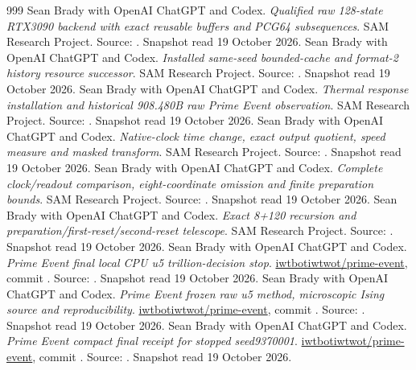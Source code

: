 \begin{thebibliography}{999}
 Sean Brady with OpenAI ChatGPT and Codex. \emph{Qualified raw 128-state RTX3090 backend with exact reusable buffers and PCG64 subsequences}. SAM Research Project. Source: . Snapshot read 19 October 2026.
 Sean Brady with OpenAI ChatGPT and Codex. \emph{Installed same-seed bounded-cache and format-2 history resource successor}. SAM Research Project. Source: . Snapshot read 19 October 2026.
 Sean Brady with OpenAI ChatGPT and Codex. \emph{Thermal response installation and historical 908.480B raw Prime Event observation}. SAM Research Project. Source: . Snapshot read 19 October 2026.
 Sean Brady with OpenAI ChatGPT and Codex. \emph{Native-clock time change, exact output quotient, speed measure and masked transform}. SAM Research Project. Source: . Snapshot read 19 October 2026.
 Sean Brady with OpenAI ChatGPT and Codex. \emph{Complete clock/readout comparison, eight-coordinate omission and finite preparation bounds}. SAM Research Project. Source: . Snapshot read 19 October 2026.
 Sean Brady with OpenAI ChatGPT and Codex. \emph{Exact 8+120 recursion and preparation/first-reset/second-reset telescope}. SAM Research Project. Source: . Snapshot read 19 October 2026.
 Sean Brady with OpenAI ChatGPT and Codex. \emph{Prime Event final local CPU u5 trillion-decision stop}. \href{https://github.com/iwtbotiwtwot/prime-event/blob/eab9da08608489ef62dc418a4e7113e4e14fb6fe/docs/local-trillion.md}{iwtbotiwtwot/prime-event}, commit . Source: . Snapshot read 19 October 2026.
 Sean Brady with OpenAI ChatGPT and Codex. \emph{Prime Event frozen raw u5 method, microscopic Ising source and reproducibility}. \href{https://github.com/iwtbotiwtwot/prime-event/blob/eab9da08608489ef62dc418a4e7113e4e14fb6fe/docs/latest-u5.md}{iwtbotiwtwot/prime-event}, commit . Source: . Snapshot read 19 October 2026.
 Sean Brady with OpenAI ChatGPT and Codex. \emph{Prime Event compact final receipt for stopped seed9370001}. \href{https://github.com/iwtbotiwtwot/prime-event/blob/eab9da08608489ef62dc418a4e7113e4e14fb6fe/evidence/local-u5-20261003/FINAL.json}{iwtbotiwtwot/prime-event}, commit . Source: . Snapshot read 19 October 2026.

\end{thebibliography}
